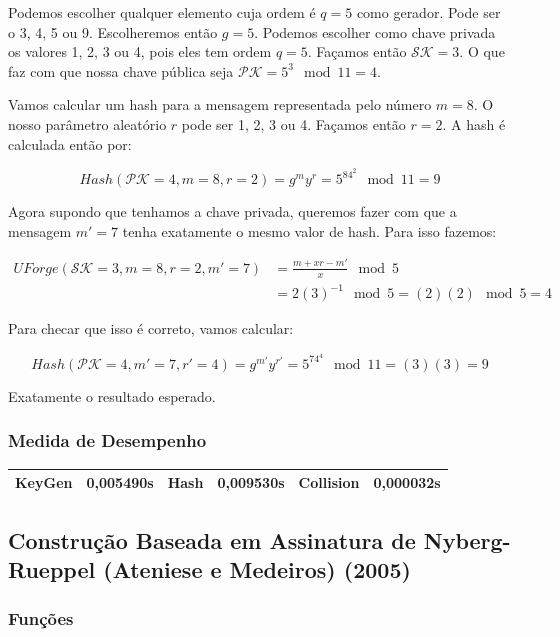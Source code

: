\documentclass[a4paper]{article}
\begin{document}
Podemos escolher qualquer elemento cuja ordem é $q=5$ como
gerador. Pode ser o 3, 4, 5 ou 9. Escolheremos então $g=5$. Podemos
escolher como chave privada os valores 1, 2, 3 ou 4, pois eles tem
ordem $q=5$. Façamos então $\mathcal{SK}=3$. O que faz com que nossa
chave pública seja $\mathcal{PK}=5^3\mod 11 = 4$.

Vamos calcular um hash para a mensagem representada pelo número
$m=8$. O nosso parâmetro aleatório $r$ pode ser 1, 2, 3 ou 4. Façamos
então $r=2$. A hash é calculada então por:

$$
Hash(\mathcal{PK}=4, m=8, r=2) = g^my^r = 5^84^2 \mod 11 = 9
$$

Agora supondo que tenhamos a chave privada, queremos fazer com que a
mensagem $m'=7$ tenha exatamente o mesmo valor de hash. Para isso
fazemos:

\begin{equation}
\begin{split}
  UForge(\mathcal{SK}=3, m=8, r=2, m'=7) &= \frac{m+xr-m'}{x} \mod 5\\
  &= 2(3)^{-1} \mod 5 = (2)(2) \mod 5 = 4
\end{split}
\end{equation}

Para checar que isso é correto, vamos calcular:

$$ Hash(\mathcal{PK}=4, m'=7, r'=4) = g^{m'}y^{r'} = 5^74^4 \mod 11 =
(3)(3)= 9
$$

Exatamente o resultado esperado.

\subsubsection{Medida de Desempenho}

\begin{center}
\begin{tabular}{|c|c|c|c|c|c|}
  \hline
  KeyGen & 0,005490s & Hash & 0,009530s & Collision & 0,000032s\\
  \hline
\end{tabular}
\end{center}

\subsection{Construção Baseada em Assinatura de Nyberg-Rueppel (Ateniese e Medeiros) (2005)\cite{ateniese}}

\subsubsection{Funções}
\end{document}
